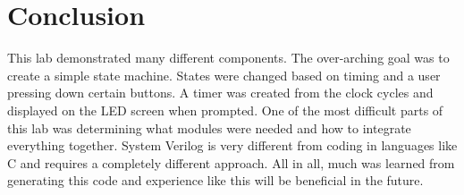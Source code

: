 \documentclass[11pt]{article}
\begin{document}
\section*{Conclusion}
This lab demonstrated many different components. The over-arching goal was to create a simple state machine. States were changed based on timing and a user pressing down certain buttons. A timer was created from the clock cycles and displayed on the LED screen when prompted. One of the most difficult parts of this lab was determining what modules were needed and how to integrate everything together. System Verilog is very different from coding in languages like C and requires a completely different approach. All in all, much was learned from generating this code and experience like this will be beneficial in the future. 
\end{document}
